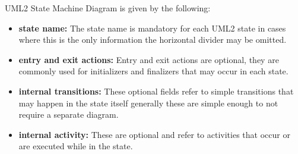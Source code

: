 \begin{definition}
UML2 State Machine Diagram is given by the following:

\label{def:uml2}
\begin{itemize}
	\item \textbf{state name:} The state name is mandatory for each UML2 state in cases where this is the only information the horizontal divider may be omitted.
	\item \textbf{entry and exit actions:} Entry and exit actions are optional, they are commonly used for initializers and finalizers that may occur in each state.
	\item \textbf{internal transitions:} These optional fields refer to simple transitions that may happen in the state itself generally these are simple enough to not require a separate diagram.
	\item \textbf{internal activity:} These are optional and refer to activities that occur or are executed while in the state.
\end{itemize}
\end{definition}
